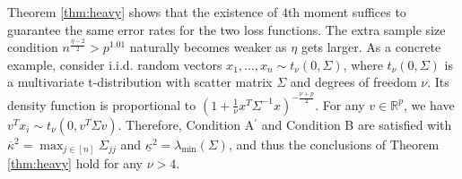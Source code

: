 Theorem \ref{thm:heavy} shows that the existence of $4$th moment suffices to guarantee the same error rates for the two loss functions. The extra sample size condition $n^{\frac{\eta-2}{2}}>p^{1.01}$ naturally becomes weaker as $\eta$ gets larger. As a concrete example, consider i.i.d. random vectors $x_1,...,x_n\sim t_{\nu}(0,\Sigma)$, where $t_{\nu}(0,\Sigma)$ is a multivariate t-distribution with scatter matrix $\Sigma$ and degrees of freedom $\nu$. Its density function is proportional to $\left(1+\frac{1}{\nu}x^T\Sigma^{-1}x\right)^{-\frac{\nu+p}{2}}$. For any $v\in\mathbb{R}^p$, we have $v^Tx_i\sim t_{\nu}(0,v^T\Sigma v)$. Therefore, Condition A${}^\prime$ and Condition B are satisfied with $\overline{\kappa}^2=\max_{j\in[n]}\Sigma_{jj}$ and $\underline{\kappa}^2=\lambda_{\min}(\Sigma)$, and thus the conclusions of Theorem \ref{thm:heavy} hold for any $\nu>4$.
